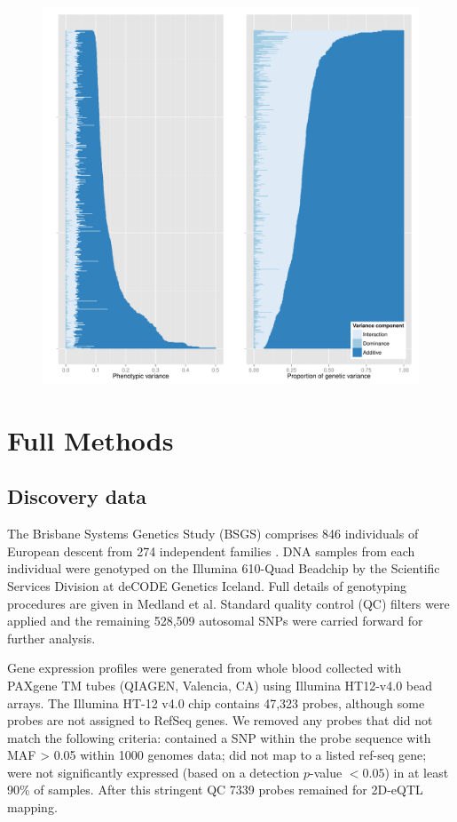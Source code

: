 \documentclass{article}
\begin{document}
\begin{figure}
	\centering
	\includegraphics[width=5in]{variance_components.pdf}
	\caption{}
\end{figure}
\clearpage


\section{Full Methods}

\subsection{Discovery data}

The Brisbane Systems Genetics Study (BSGS) comprises 846 individuals of European descent from 274 independent families \cite{pmid22563384}. DNA samples from each individual were genotyped on the Illumina 610-Quad Beadchip by the Scientific Services Division at deCODE Genetics Iceland. Full details of genotyping procedures are given in Medland et al. \cite{Medland2009} Standard quality control (QC) filters were applied and the remaining 528,509 autosomal SNPs were carried forward for further analysis. 

Gene expression profiles were generated from whole blood collected with PAXgene TM tubes (QIAGEN, Valencia, CA) using Illumina HT12-v4.0 bead arrays. The Illumina HT-12 v4.0 chip contains 47,323 probes, although some probes are not assigned to RefSeq genes. We removed any probes that did not match the following criteria: contained a SNP within the probe sequence with MAF > 0.05 within 1000 genomes data; did not map to a listed ref-seq gene; were not significantly expressed (based on a detection $p$-value $< 0.05$) in at least 90\% of samples. After this stringent QC 7339 probes remained for 2D-eQTL mapping.
\end{document}
